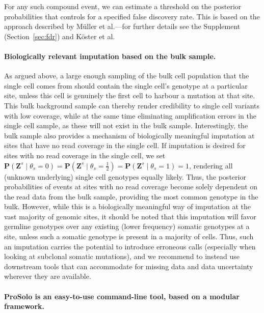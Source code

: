 \documentclass[12pt,inline]{wlscirep}
\newcommand{\Prob}{{\mathbf{P}}}
\begin{document}
For any such compound event, we can estimate a threshold on the posterior probabilities that controls for a specified false discovery rate. 
This is based on the approach described by Müller et al.\cite{muller_optimal_2004,muller_fdr_2006}---for further details see the Supplement (Section~\ref{sec:fdr}) and Köster et al\cite{koster_varlociraptor_2020}.

\paragraph{Biologically relevant imputation based on the bulk sample.}
As argued above, a large enough sampling of the bulk cell population that the single cell comes from should contain the single cell's genotype at a particular site, unless this cell is genuinely the first cell to harbour a mutation at that site.
This bulk background sample can thereby render credibility to single cell variants with low coverage, while at the same time eliminating amplification errors in the single cell sample, as these will not exist in the bulk sample.
Interestingly, the bulk sample also provides a mechanism of biologically meaningful imputation at sites that have no read coverage in the single cell.
If imputation is desired for sites with no read coverage in the single cell, we set $\Prob(\boldsymbol{Z}^s \mid \theta_s = 0) = \Prob(\boldsymbol{Z}^s \mid \theta_s = \frac{1}{2}) = \Prob(\boldsymbol{Z}^s \mid \theta_s = 1) = 1$, rendering all (unknown underlying) single cell genotypes equally likely.
Thus, the posterior probabilities of events at sites with no read coverage become solely dependent on the read data from the bulk sample, providing the most common genotype in the bulk.
However, while this is a biologically meaningful way of imputation at the vast majority of genomic sites, it should be noted that this imputation will favor germline genotypes over any existing (lower frequency) somatic genotypes at a site, unless such a somatic genotype is present in a majority of cells.
Thus, such an imputation carries the potential to introduce erroneous calls (especially when looking at subclonal somatic mutations), and we recommend to instead use downstream tools that can accommodate for missing data and data uncertainty wherever they are available.

\paragraph{ProSolo is an easy-to-use command-line tool, based on a modular framework.}
\end{document}
